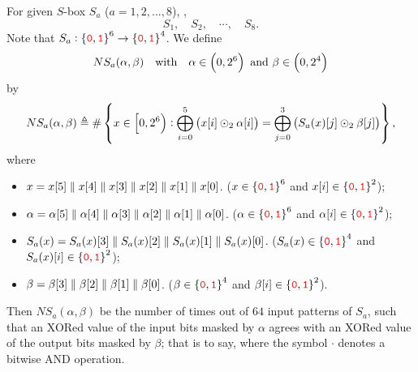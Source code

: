 \begin{tcolorbox}[colframe=defcolor,title={\color{white}\bf SBOX}]
\begin{definition}
For given $S$-box $S_a$ ($a = 1,2,...,8$), \ie, \[
S_1,\quad S_2,\quad\cdots,\quad S_8.
\] Note that $S_a:\set{\textcolor{red}{\texttt{0}},\textcolor{red}{\texttt{1}}}^{6}\to\set{\textcolor{red}{\texttt{0}},\textcolor{red}{\texttt{1}}}^{4}$. We define \[
NS_a(\alpha,\beta)\quad\text{with}\quad \alpha\in\intoo{0, 2^6}\ \text{and}\ \beta\in\intoo{0,2^4}
\] by
\[
NS_a(\alpha,\beta)\triangleq \#\set{x\in\intco{0, 2^6}:\bigoplus_{i=0}^5\of{x[i]\odot_2 \alpha[i]}=\bigoplus_{j=0}^3\of{S_a(x)[j]\odot_2 \beta[j]}},
\] where \begin{itemize}
	\item $x=x[5]\parallel x[4]\parallel x[3]\parallel x[2]\parallel x[1]\parallel x[0]$. ($x\in\set{\textcolor{red}{\texttt{0}},\textcolor{red}{\texttt{1}}}^{6}$ and $x[i]\in\set{\textcolor{red}{\texttt{0}},\textcolor{red}{\texttt{1}}}^2$);
	\item $\alpha=\alpha[5]\parallel \alpha[4]\parallel \alpha[3]\parallel \alpha[2]\parallel \alpha[1]\parallel \alpha[0]$. ($\alpha\in\set{\textcolor{red}{\texttt{0}},\textcolor{red}{\texttt{1}}}^{6}$ and $\alpha[i]\in\set{\textcolor{red}{\texttt{0}},\textcolor{red}{\texttt{1}}}^2$);
	\item $S_a(x)=S_a(x)[3]\parallel S_a(x)[2]\parallel S_a(x)[1]\parallel S_a(x)[0]$. ($S_a(x)\in\set{\textcolor{red}{\texttt{0}},\textcolor{red}{\texttt{1}}}^{4}$ and $S_a(x)[i]\in\set{\textcolor{red}{\texttt{0}},\textcolor{red}{\texttt{1}}}^2$);
	\item $\beta=\beta[3]\parallel \beta[2]\parallel \beta[1]\parallel \beta[0]$. ($\beta\in\set{\textcolor{red}{\texttt{0}},\textcolor{red}{\texttt{1}}}^{4}$ and $\beta[i]\in\set{\textcolor{red}{\texttt{0}},\textcolor{red}{\texttt{1}}}^2$).
\end{itemize}


Then $NS_a(\alpha,\beta)$ be the number of times out of $64$ input patterns of $S_a$, such that an XORed value of the input bits masked by $\alpha$ agrees with an XORed value of the output bits masked by $\beta$; that is to say,
where the symbol $\cdot$ denotes a bitwise AND operation.
\end{definition}
\end{tcolorbox}


